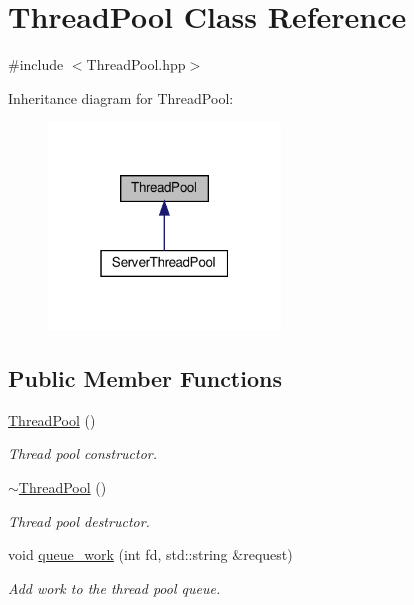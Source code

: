 \hypertarget{classThreadPool}{}\section{Thread\+Pool Class Reference}
\label{classThreadPool}


{\ttfamily \#include $<$Thread\+Pool.\+hpp$>$}



Inheritance diagram for Thread\+Pool\+:\nopagebreak
\begin{figure}[H]
\begin{center}
\leavevmode
\includegraphics[width=175pt]{classThreadPool__inherit__graph}
\end{center}
\end{figure}
\subsection*{Public Member Functions}
\begin{DoxyCompactItemize}
\item 
\mbox{\label{classThreadPool_a3225e86aa7835545b3f6c2c8d363d5e5}} 
\hyperlink{classThreadPool_a3225e86aa7835545b3f6c2c8d363d5e5}{Thread\+Pool} ()
\begin{DoxyCompactList}\small\item\em Thread pool constructor. \end{DoxyCompactList}\item 
\mbox{\label{classThreadPool_a44d3d2ab618970605e684efc216655eb}} 
\hyperlink{classThreadPool_a44d3d2ab618970605e684efc216655eb}{$\sim$\+Thread\+Pool} ()
\begin{DoxyCompactList}\small\item\em Thread pool destructor. \end{DoxyCompactList}\item 
\mbox{\label{classThreadPool_a152a5b1a5ed2274fff48fd03415a4c11}} 
void \hyperlink{classThreadPool_a152a5b1a5ed2274fff48fd03415a4c11}{queue\+\_\+work} (int fd, std\+::string \&request)
\begin{DoxyCompactList}\small\item\em Add work to the thread pool queue. \end{DoxyCompactList}\end{DoxyCompactItemize}


